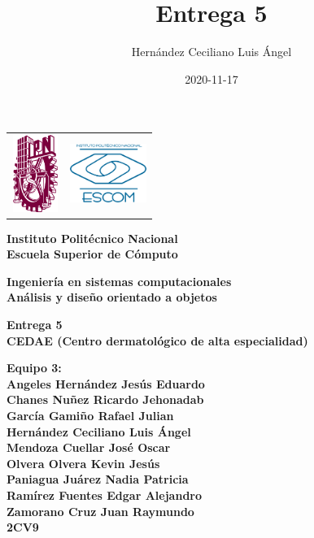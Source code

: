 \documentclass[12pt,letterpaper]{article}
\author{Hern\'andez Ceciliano Luis \'Angel}
\title{Entrega 5}
\date {2020-11-17}
\begin{document}
	\pagestyle{plain}
	{

		{
			\begin{tabular}
				{
					p{} 
					p{} 
				}
				\includegraphics[width=1.5cm, height=2.5cm]{ipn.png} &  
				\includegraphics[width=2.5cm, height=2cm]{escom.png}
			\end{tabular}
		}

		\begin{center}

			\par\vspace{1cm} %
			{
				\Huge\textbf
				{
					Instituto Polit\'ecnico Nacional 
					\\[.2cm]Escuela Superior de C\'omputo
				}
			}

			\par\vspace{0.5cm}
			{
				\large\textbf
				{
					Ingenier\'ia en sistemas computacionales 
					\\[.5cm]An\'alisis y diseño orientado a objetos
				}
			}

			\vfill

			\par\vspace{0.7cm}
			{
				\textbf
				{
					Entrega 5 \\
                    CEDAE (Centro dermatológico de alta especialidad)
				}
			}

			\vfill

			\par\vspace{0.7cm}
			{
				\textbf
				{
                    Equipo 3:
                    \\Angeles Hernández Jesús Eduardo
                    \\Chanes Nuñez Ricardo Jehonadab
                    \\García Gamiño Rafael Julian
                    \\Hernández Ceciliano Luis Ángel
                    \\Mendoza Cuellar José Oscar
                    \\Olvera Olvera Kevin Jesús
                    \\Paniagua Juárez Nadia Patricia
                    \\Ramírez Fuentes Edgar Alejandro
                    \\Zamorano Cruz Juan Raymundo
					\\2CV9
				} 
			}


\end{center}}
\end{document}
